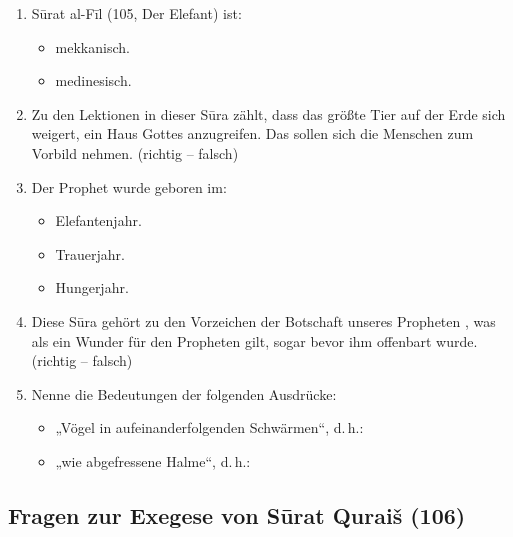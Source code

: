 \begin{enumerate}[leftmargin=1.6em,resume]
\item Sūrat al-Fīl (105, Der Elefant) ist:
  \begin{itemize}
    \item mekkanisch. \item medinesisch.
  \end{itemize}
\item Zu den Lektionen in dieser Sūra zählt, dass das größte Tier auf der Erde sich weigert, ein
  Haus Gottes anzugreifen. Das sollen sich die Menschen zum Vorbild nehmen. (richtig -- falsch)
\item Der Prophet  wurde geboren im:
  \begin{itemize}
    \item Elefantenjahr. \item Trauerjahr. \item Hungerjahr.
  \end{itemize}
\item Diese Sūra gehört zu den Vorzeichen der Botschaft unseres Propheten , was als ein
  Wunder für den Propheten gilt, sogar bevor ihm offenbart wurde. (richtig -- falsch)
\item Nenne die Bedeutungen der folgenden Ausdrücke:
  \begin{itemize}
    \item „Vögel in aufeinanderfolgenden Schwärmen“, d.\,h.: \dotfill
    \item „wie abgefressene Halme“, d.\,h.: \dotfill
  \end{itemize}
\end{enumerate}

\subsection*{Fragen zur Exegese von Sūrat Quraiš (106)}

